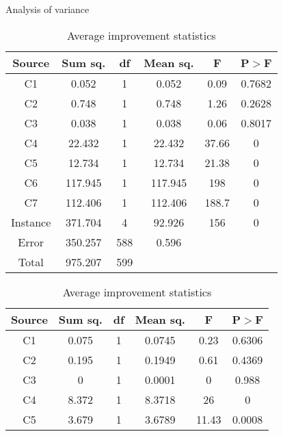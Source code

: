 \documentclass[../main.tex]{subfiles}
\begin{document}
\begin{table}
    \centering
    \caption{Analysis of variance}
    \begin{adjustbox}{width=\columnwidth,center}
        \begin{subtable}{.75\columnwidth}
            \centering
            \begin{tabular}{cccccc}
            \hline
            Source  &Sum sq.    &df &Mean sq.   &F      &P$>$F \\ 
            \hline
            C1      & 0.052     & 1 & 0.052     & 0.09  & 0.7682\\
            C2      & 0.748     & 1 & 0.748     & 1.26  & 0.2628\\
            C3      & 0.038     & 1 & 0.038     & 0.06  & 0.8017\\
            C4      & 22.432    & 1 & 22.432    & 37.66 & 0     \\
            C5      & 12.734    & 1 & 12.734    & 21.38 & 0     \\
            C6      & 117.945   & 1 & 117.945   & 198   & 0     \\
            C7      & 112.406   & 1 & 112.406   & 188.7 & 0     \\
            Instance& 371.704   & 4 & 92.926    & 156   & 0     \\
            Error   & 350.257   &588& 0.596     &       &       \\
            Total   & 975.207   &599&           &       &       \\
            \hline
            \end{tabular}
        \caption{Average improvement statistics}
        \label{tab:anovaAvrgNormal}
        \end{subtable}
        \hfill
        \begin{subtable}{.75\columnwidth}
            \centering
            \begin{tabular}{cccccc}
            \hline
            Source  &Sum sq.    &df &Mean sq.   &F      &P$>$F \\ 
            \hline
            C1      & 0.075     & 1 & 0.0745    & 0.23  & 0.6306\\
            C2      & 0.195     & 1 & 0.1949    & 0.61  & 0.4369\\
            C3      & 0         & 1 & 0.0001    & 0     & 0.988 \\
            C4      & 8.372     & 1 & 8.3718    & 26    & 0     \\
            C5      & 3.679     & 1 & 3.6789    & 11.43 & 0.0008\\

\end{tabular}
\end{subtable}
\end{adjustbox}
\end{table}
\end{document}
